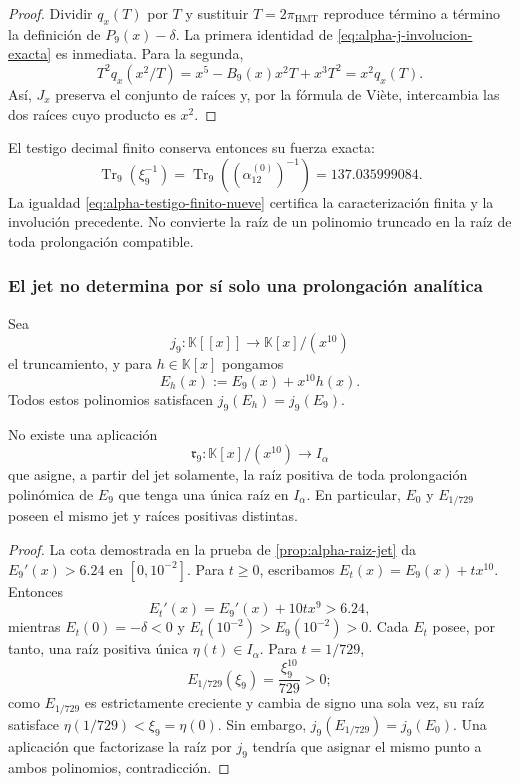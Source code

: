 \begin{proof}
Dividir \(q_x(T)\) por \(T\) y sustituir
\(T=2\pi_{\mathrm{HMT}}\) reproduce término a término la definición de
\(P_9(x)-\delta\). La primera identidad de
\eqref{eq:alpha-j-involucion-exacta} es inmediata. Para la segunda,
\[
 T^2q_x(x^2/T)
 =x^5-B_9(x)x^2T+x^3T^2=x^2q_x(T).
\]
Así, \(J_x\) preserva el conjunto de raíces y, por la fórmula de Viète,
intercambia las dos raíces cuyo producto es \(x^2\).
\end{proof}

El testigo decimal finito conserva entonces su fuerza exacta:
\begin{equation}
 \operatorname{Tr}_9(\xi_9^{-1})
 =\operatorname{Tr}_9\!\left((\alpha_{12}^{(0)})^{-1}\right)
 =137.035999084.
 \label{eq:alpha-testigo-finito-nueve}
\end{equation}
La igualdad \eqref{eq:alpha-testigo-finito-nueve} certifica la
caracterización finita y la involución precedente. No convierte la raíz de
un polinomio truncado en la raíz de toda prolongación compatible.

\subsubsection{El jet no determina por sí solo una prolongación analítica}

Sea
\[
 j_9:\mathbb K[[x]]\longrightarrow \mathbb K[x]/(x^{10})
\]
el truncamiento, y para \(h\in\mathbb K[x]\) pongamos
\begin{equation}
 E_h(x):=E_9(x)+x^{10}h(x).
 \label{eq:alpha-familia-prolongaciones-mismo-jet}
\end{equation}
Todos estos polinomios satisfacen \(j_9(E_h)=j_9(E_9)\).

\begin{theorem}
\label{thm:alpha-no-unicidad-prolongacion-jet}
No existe una aplicación
\[
 \mathfrak r_9:\mathbb K[x]/(x^{10})\longrightarrow I_\alpha
\]
que asigne, a partir del jet solamente, la raíz positiva de toda
prolongación polinómica de \(E_9\) que tenga una única raíz en
\(I_\alpha\). En particular, \(E_0\) y \(E_{1/729}\) poseen el mismo jet y
raíces positivas distintas.
\end{theorem}

\begin{proof}
La cota demostrada en la prueba de
\ref{prop:alpha-raiz-jet} da \(E_9'(x)>6.24\) en
\([0,10^{-2}]\). Para \(t\geq0\), escribamos
\(E_t(x)=E_9(x)+tx^{10}\). Entonces
\[
 E_t'(x)=E_9'(x)+10tx^9>6.24,
\]
mientras \(E_t(0)=-\delta<0\) y
\(E_t(10^{-2})>E_9(10^{-2})>0\). Cada \(E_t\) posee, por tanto, una raíz
positiva única \(\eta(t)\in I_\alpha\). Para \(t=1/729\),
\[
 E_{1/729}(\xi_9)=\frac{\xi_9^{10}}{729}>0;
\]
como \(E_{1/729}\) es estrictamente creciente y cambia de signo una sola
vez, su raíz satisface \(\eta(1/729)<\xi_9=\eta(0)\). Sin embargo,
\(j_9(E_{1/729})=j_9(E_0)\). Una aplicación que factorizase la raíz por
\(j_9\) tendría que asignar el mismo punto a ambos polinomios, contradicción.
\end{proof}


